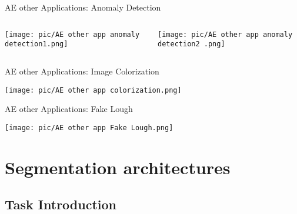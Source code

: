 \documentclass[serif, aspectratio=169]{beamer}
\begin{document}
\begin{frame}{AE other Applications: Anomaly Detection}
    \begin{columns}
        \begin{column}{0.5\textwidth}
            \begin{center}
                \texttt{[image: pic/AE other app anomaly detection1.png]}
            \end{center}
        \end{column}

        \begin{column}{0.5\textwidth}
            \begin{center}
                \texttt{[image: pic/AE other app anomaly detection2 .png]}
            \end{center}
        \end{column}
    \end{columns}
\end{frame}

\begin{frame}{AE other Applications: Image Colorization}
      \begin{center}
        \texttt{[image: pic/AE other app colorization.png]} 
    \end{center}
\end{frame}


\begin{frame}{AE other Applications: Fake Lough}
      \begin{center}
        \texttt{[image: pic/AE other app Fake Lough.png]} 
    \end{center}
\end{frame}



\section{Segmentation architectures}

\subsection{Task Introduction}
\end{document}

